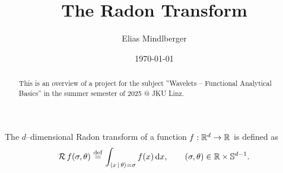 \documentclass[a4paper,12pt]{amsart}
\begin{document}
\title{The Radon Transform}
\author{Elias Mindlberger}


\date{\today}

\begin{abstract}
    This is an overview of a project for the subject ''Wavelets -- Functional Analytical Basics'' in the summer semester of 2025 @ JKU Linz.
\end{abstract}

\maketitle

The \(d\)--dimensional Radon transform of a function \(f: \mathbb{R}^d \to \mathbb{R}\) is defined as
\[
    \operatorname{\mathcal{R}} f(\sigma, \theta) \operatorname{\, \stackrel{def}{=} \,} \int_{\left\langle x\, \mid\, \theta \right\rangle = \sigma}^{} f(x)\, \mathrm{d} x,\qquad (\sigma, \theta) \in \mathbb{R} \times \mathbb{S}^{d-1}.
\]
\end{document}
